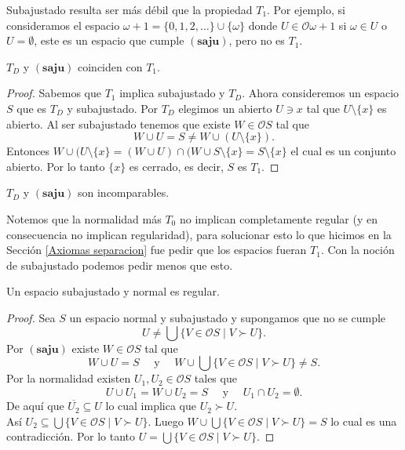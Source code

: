 \documentclass{comunicaciones}
\begin{document}
Subajustado resulta ser más débil que la propiedad $T_1$. Por ejemplo, si consideramos el espacio $\omega +1=\{0, 1, 2, \dots \}\cup \{\omega\}$ donde $U\in \mathcal{O}\omega +1$ si $\omega\in U$ o $U=\emptyset$, este es un espacio que cumple $(\mathbf{saju})$, pero no es $T_1$.

\begin{prop}
    $T_D$ y $(\mathbf{saju})$ coinciden con $T_1$.
\end{prop}

\begin{proof}
    Sabemos que $T_1$ implica subajustado y $T_D$. Ahora consideremos un espacio $S$ que es $T_D$ y subajustado. Por $T_D$ elegimos un abierto $U\ni x$ tal que $U\setminus \{x\}$ es abierto. Al ser subajustado tenemos que existe $W\in \mathcal{O}S$ tal que 
    \[
    W\cup U=S\neq W\cup (U\setminus \{x\}).
    \]
    Entonces $W\cup (U\setminus\{x\}=(W\cup U)\cap (W\cup S\setminus\{x\}=S\setminus\{x\}$ el cual es un conjunto abierto. Por lo tanto $\{x\}$ es cerrado, es decir, $S$ es $T_1$.
\end{proof}

\begin{cor}
    $T_D$ y $(\mathbf{saju})$ son incomparables.
\end{cor}

Notemos que la normalidad más $T_0$ no implican completamente regular (y en consecuencia no implican regularidad), para solucionar esto lo que hicimos en la Sección \ref{Axiomas separacion} fue pedir que los espacios fueran $T_1$. Con la noción de subajustado podemos pedir menos que esto.

\begin{prop}
    Un espacio subajustado y normal es regular.
\end{prop}

\begin{proof}
    Sea $S$ un espacio normal y subajustado y supongamos que no se cumple 
    \[
    U\neq \bigcup\{V\in \mathcal{O}S\mid V\succ U\}.
    \]
    Por $(\mathbf{saju})$ existe $W\in\mathcal{O}S$ tal que 
    \[
    W\cup U=S\quad\mbox{ y }\quad W\cup \bigcup\{V\in \mathcal{O}S\mid V\succ U\}\neq S.
    \]
    Por la normalidad existen $U_1, U_2\in \mathcal{O}S$ tales que 
    \[
    U\cup U_1=W\cup U_2=S\quad\mbox{ y }\quad U_1\cap U_2=\emptyset.
    \]
    De aquí que $\overline{U_2}\subseteq U$ lo cual implica que $U_2\succ U$. \\
    
    \noindent
    Así $U_2\subseteq\bigcup\{V\in \mathcal{O}S\mid V\succ U\}$. Luego $W\cup\bigcup\{V\in \mathcal{O}S\mid V\succ U\}=S$ lo cual es una contradicción. Por lo tanto $U=\bigcup\{V\in \mathcal{O}S\mid V\succ U\}$.
    \end{proof}
    
\end{document}
